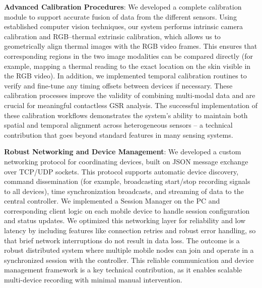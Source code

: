 \textbf{Advanced Calibration Procedures}: We developed a complete calibration module to support accurate fusion of data from the different sensors. Using established computer vision techniques, our system performs intrinsic camera calibration and RGB--thermal extrinsic calibration, which allows us to geometrically align thermal images with the RGB video frames. This ensures that corresponding regions in the two image modalities can be compared directly (for example, mapping a thermal reading to the exact location on the skin visible in the RGB video). In addition, we implemented temporal calibration routines to verify and fine-tune any timing offsets between devices if necessary. These calibration processes improve the validity of combining multi-modal data and are crucial for meaningful contactless GSR analysis. The successful implementation of these calibration workflows demonstrates the system's ability to maintain both spatial and temporal alignment across heterogeneous sensors -- a technical contribution that goes beyond standard features in many sensing systems.

\textbf{Robust Networking and Device Management}: We developed a custom networking protocol for coordinating devices, built on JSON message exchange over TCP/UDP sockets. This protocol supports automatic device discovery, command dissemination (for example, broadcasting start/stop recording signals to all devices), time synchronization broadcasts, and streaming of data to the central controller. We implemented a Session Manager on the PC and corresponding client logic on each mobile device to handle session configuration and status updates. We optimized this networking layer for reliability and low latency by including features like connection retries and robust error handling, so that brief network interruptions do not result in data loss. The outcome is a robust distributed system where multiple mobile nodes can join and operate in a synchronized session with the controller. This reliable communication and device management framework is a key technical contribution, as it enables scalable multi-device recording with minimal manual intervention.

